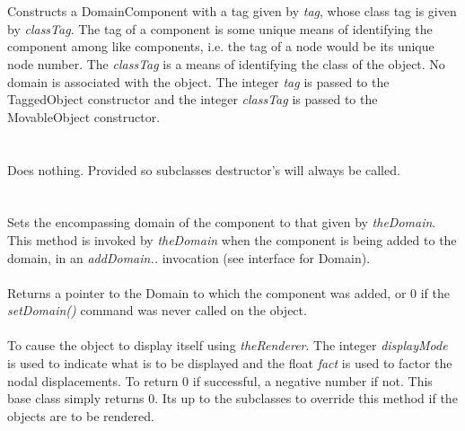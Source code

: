   \\
  \\
Constructs a DomainComponent with a tag given by {\em tag}, whose
class tag is given by {\em classTag}. The tag of
a component is some unique means of identifying the component among
like components, i.e. the tag of a node would be its unique node
number. The {\em classTag} is a means of identifying the class of the object.
No domain is associated with the object. The integer {\em tag} is
passed to the TaggedObject constructor and the integer {\em classTag}
is passed to the MovableObject constructor. \\

  \\
  \\
Does nothing. Provided so subclasses destructor's will always be
called. \\

  \\
 \\
Sets the encompassing domain of the component to that given by {\em
theDomain}. This method is invoked by {\em theDomain} when the component is
being added to the domain, in an {\em addDomain..} invocation (see
interface for Domain). \\

\\
Returns a pointer to the Domain to which the component was added,
or $0$ if the {\em setDomain()} command was never called on the
object. \\

 \\ 
To cause the object to display itself using {\em theRenderer}. The
integer {\em displayMode} is used to indicate what is to be displayed
and the float {\em fact} is used to factor the nodal displacements. 
To return $0$ if successful, a negative number if not. This base
class simply returns $0$. Its up to the subclasses to override this
method if the objects are to be rendered.

